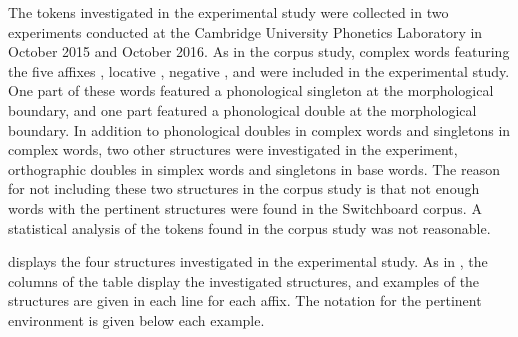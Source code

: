 The tokens investigated in the experimental study were collected in two experiments conducted at the Cambridge University Phonetics Laboratory in October 2015 and October 2016. 
 As in the corpus study, complex words featuring the five affixes , locative , negative ,  and  were included  in the experimental study. One part of these words featured a phonological singleton at the morphological boundary, and one part  featured a phonological double at the morphological boundary. In addition to phonological doubles in complex words and singletons in complex words, two other structures were investigated in the experiment, orthographic doubles in simplex words and singletons in base words. The reason for not including these two structures in the corpus study is that not enough words with the pertinent structures were found in the Switchboard corpus. A statistical analysis of the tokens found in the corpus study was not reasonable.
 
  displays the four structures investigated in the experimental study. As in , the columns of the table display the investigated structures, and examples of the structures are given in each line for each affix. The notation for the pertinent environment is given below each example. 
 
